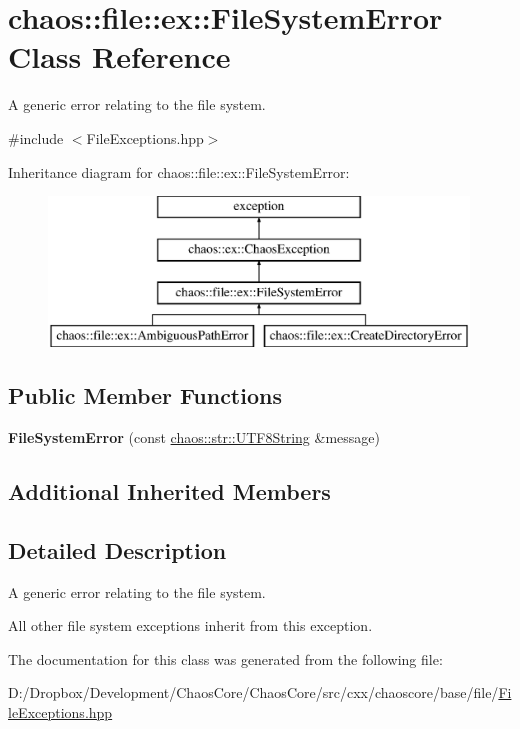 \hypertarget{classchaos_1_1file_1_1ex_1_1_file_system_error}{}\section{chaos\+:\+:file\+:\+:ex\+:\+:File\+System\+Error Class Reference}
\label{classchaos_1_1file_1_1ex_1_1_file_system_error}


A generic error relating to the file system.  




{\ttfamily \#include $<$File\+Exceptions.\+hpp$>$}

Inheritance diagram for chaos\+:\+:file\+:\+:ex\+:\+:File\+System\+Error\+:\begin{figure}[H]
\begin{center}
\leavevmode
\includegraphics[height=4.000000cm]{classchaos_1_1file_1_1ex_1_1_file_system_error}
\end{center}
\end{figure}
\subsection*{Public Member Functions}
\begin{DoxyCompactItemize}
\item 
\hypertarget{classchaos_1_1file_1_1ex_1_1_file_system_error_a9064725b51e0d7dd4abac756e8bf27c2}{}{\bfseries File\+System\+Error} (const \hyperlink{classchaos_1_1str_1_1_u_t_f8_string}{chaos\+::str\+::\+U\+T\+F8\+String} \&message)\label{classchaos_1_1file_1_1ex_1_1_file_system_error_a9064725b51e0d7dd4abac756e8bf27c2}

\end{DoxyCompactItemize}
\subsection*{Additional Inherited Members}


\subsection{Detailed Description}
A generic error relating to the file system. 

All other file system exceptions inherit from this exception. 

The documentation for this class was generated from the following file\+:\begin{DoxyCompactItemize}
\item 
D\+:/\+Dropbox/\+Development/\+Chaos\+Core/\+Chaos\+Core/src/cxx/chaoscore/base/file/\hyperlink{_file_exceptions_8hpp}{File\+Exceptions.\+hpp}\end{DoxyCompactItemize}
